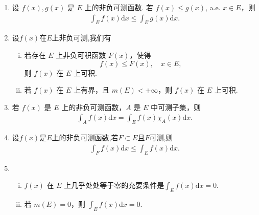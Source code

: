 \documentclass[../../main.tex]{subfiles}
\begin{document}
\begin{theorem}[非负可测函数积分的性质]\label{theorem:非负可测函数积分的性质}
\begin{enumerate}[(1)]
\item 设 \(f(x),g(x)\) 是 \(E\) 上的非负可测函数. 若 \(f(x)\leqslant g(x)\), a.e. \(x\in E\)，则
\begin{align*}
\int_{E}f(x)\mathrm{d}x\leqslant \int_{E}g(x)\mathrm{d}x.
\end{align*}

\item 设$f(x)$在$E$上非负可测,我们有
\begin{enumerate}[(i)]
\item 若存在 \(E\) 上非负可积函数 \(F(x)\)，使得
\[f(x)\leqslant F(x),\quad x\in E,\]
则 \(f(x)\) 在 \(E\) 上可积.

\item 若 \(f(x)\) 在 \(E\) 上有界，且 \(m(E)< +\infty\)，则 \(f(x)\) 在 \(E\) 上可积.
\end{enumerate}

\item 若 \(f(x)\) 是 \(E\) 上的非负可测函数，\(A\) 是 \(E\) 中可测子集，则
\begin{align*}
\int_{A}f(x)\mathrm{d}x=\int_{E}f(x)\chi_{A}(x)\mathrm{d}x.
\end{align*}

\item 设$f(x)$是$E$上的非负可测函数,若$F\subset E$且$F$可测,则
\begin{align*}
\int_F{f\left( x \right) \mathrm{d}x}\leqslant \int_E{f\left( x \right) \mathrm{d}x}.
\end{align*}

\item \begin{enumerate}[(i)]
\item \(f(x)\) 在 \(E\) 上几乎处处等于零的充要条件是\(\int_{E}f(x)\mathrm{d}x = 0\).

\item 若 \(m(E)=0\)，则 \(\int_{E}f(x)\mathrm{d}x = 0\).
\end{enumerate}
\end{enumerate}
\end{theorem}
\end{document}
